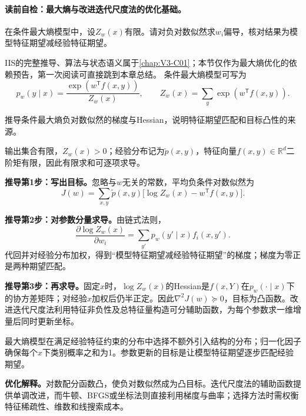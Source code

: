 \paragraph{读前自检：最大熵与改进迭代尺度法的优化基础。}在条件最大熵模型中，设$Z_w(x)$有限。请对负对数似然求$w_i$偏导，核对结果为模型特征期望减经验特征期望。\par

IIS的完整推导、算法与状态语义属于\cref{chap:V3-C01}；本节仅作为最大熵优化的依赖预告，第一次阅读可直接跳到本章总结。
条件最大熵模型可写为
\[
p_w(y\mid x)=\frac{\exp(w^{\mathsf T}f(x,y))}{Z_w(x)},\qquad
Z_w(x)=\sum_y\exp(w^{\mathsf T}f(x,y)).
\]

\begin{derivationgoalbox}
推导条件最大熵负对数似然的梯度与Hessian，说明特征期望匹配和目标凸性的来源。
\end{derivationgoalbox}
\begin{derivationprepbox}
输出集合有限，$Z_w(x)>0$；经验分布记为$\widetilde p(x,y)$，特征向量$f(x,y)\in\mathbb R^d$二阶矩有限，因此有限求和可逐项求导。
\end{derivationprepbox}
\textbf{推导第1步：写出目标。}忽略与$w$无关的常数，平均负条件对数似然为
\[
J(w)=\sum_{x,y}\widetilde p(x,y)
\bigl[\log Z_w(x)-w^{\mathsf T}f(x,y)\bigr].
\]

\textbf{推导第2步：对参数分量求导。}由链式法则，
\[
\frac{\partial\log Z_w(x)}{\partial w_i}
=\sum_{y'}p_w(y'\mid x)f_i(x,y').
\]
代回并对经验分布加权，得到“模型特征期望减经验特征期望”的梯度；梯度为零正是两种期望匹配。

\textbf{推导第3步：再求导。}固定$x$时，$\log Z_w(x)$的Hessian是$f(x,Y)$在$p_w(\cdot\mid x)$下的协方差矩阵；对经验$x$加权后仍半正定。因此$\nabla^2J(w)\succeq0$，目标为凸函数。改进迭代尺度法利用特征非负性及总特征量构造可分辅助函数，为每个参数求一维增量后同时更新坐标。

\label{struct:V1-C08-CH17}
\begin{probabilitybox}
最大熵模型在满足经验特征约束的分布中选择不额外引入结构的分布；归一化因子确保每个$x$下类别概率之和为1。参数更新的目标是让模型特征期望逐步匹配经验期望。
\end{probabilitybox}
\label{struct:V1-C08-CH18}
\begin{optimizationbox}
\textbf{优化解释。}对数配分函数凸，使负对数似然成为凸目标。迭代尺度法的辅助函数提供单调改进，而牛顿、BFGS或坐标法则直接利用梯度与曲率；选择方法时需权衡特征稀疏性、维数和线搜索成本。
\end{optimizationbox}


